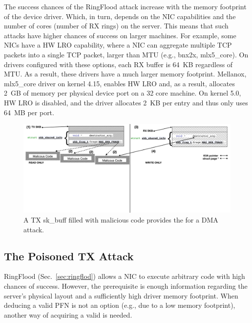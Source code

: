 The success chances of the RingFlood attack increase with the memory footprint of the device driver. Which, in turn, depends on the NIC capabilities and the number of cores (number of RX rings) on the server. This means that such attacks have higher chances of success on larger machines. 
For example, some NICs have a HW LRO capability\cite{mlx5_lro}, where a NIC can aggregate multiple TCP packets into a single TCP packet, larger than MTU (e.g., bnx2x, mlx5\_core). On drivers configured with these options, each RX buffer is 64~KB regardless of MTU. As a result, these drivers have a much larger memory footprint. Mellanox, mlx5\_core driver on kernel 4.15, enables HW LRO and, as a result, allocates 2~GB of memory per physical device port on a 32 core machine. On kernel 5.0, HW LRO is disabled, and the driver allocates 2~KB per entry and thus only uses 64~MB per port.


\begin{figure}[t]
    \centering
    \includegraphics[width=0.8\linewidth]{figs/accomplice.pdf}
    \caption{A TX sk\_buff filled with malicious code provides the \kva for a DMA attack.}
    \label{fig:payload}
\end{figure}
\subsection{The Poisoned TX \Compound{} Attack}\label{sec:posion}

RingFlood (Sec.~\ref{sec:ringflod}) allows a NIC to execute arbitrary code with high chances of success. However, the prerequisite is enough information regarding the server's physical layout and a sufficiently high driver memory footprint. When deducing a valid PFN is not an option (e.g., due to a low memory footprint), another way of acquiring a valid \kva{} is needed.

